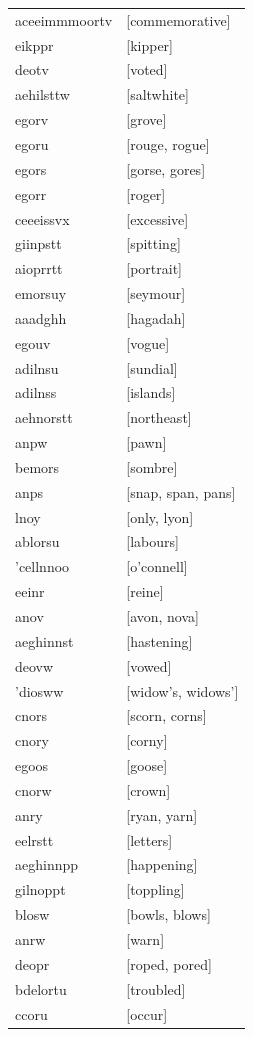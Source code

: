 \documentclass{article}
\begin{document}
\begin{tabular}{ll}
aceeimmmoortv & [commemorative] \\
eikppr & [kipper] \\
deotv & [voted] \\
aehilsttw & [saltwhite] \\
egorv & [grove] \\
egoru & [rouge, rogue] \\
egors & [gorse, gores] \\
egorr & [roger] \\
ceeeissvx & [excessive] \\
giinpstt & [spitting] \\
aioprrtt & [portrait] \\
emorsuy & [seymour] \\
aaadghh & [hagadah] \\
egouv & [vogue] \\
adilnsu & [sundial] \\
adilnss & [islands] \\
aehnorstt & [northeast] \\
anpw & [pawn] \\
bemors & [sombre] \\
anps & [snap, span, pans] \\
lnoy & [only, lyon] \\
ablorsu & [labours] \\
'cellnnoo & [o'connell] \\
eeinr & [reine] \\
anov & [avon, nova] \\
aeghinnst & [hastening] \\
deovw & [vowed] \\
'diosww & [widow's, widows'] \\
cnors & [scorn, corns] \\
cnory & [corny] \\
egoos & [goose] \\
cnorw & [crown] \\
anry & [ryan, yarn] \\
eelrstt & [letters] \\
aeghinnpp & [happening] \\
gilnoppt & [toppling] \\
blosw & [bowls, blows] \\
anrw & [warn] \\
deopr & [roped, pored] \\
bdelortu & [troubled] \\
ccoru & [occur] \\

\end{tabular}
\end{document}
